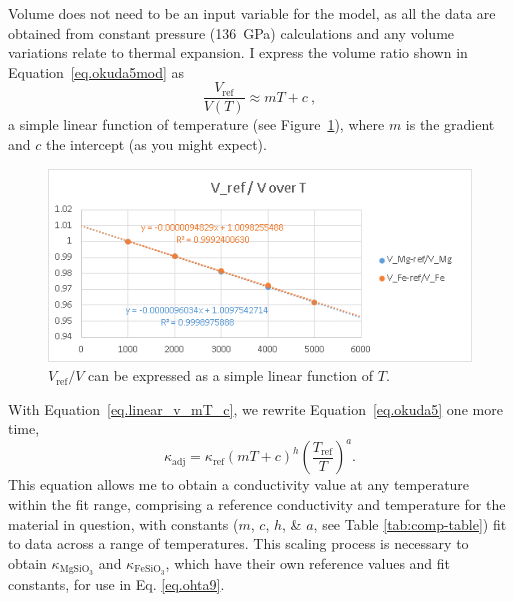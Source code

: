 Volume does not need to be an input variable for the model, as all the data are obtained from constant pressure (136~GPa) calculations and any volume variations relate to thermal expansion. I express the volume ratio shown in Equation~\ref{eq.okuda5mod} as 
%
\begin{equation}
\frac{V_{\mathrm{ref}}}{V(T)} \approx  mT+c \ ,
\label{eq.linear_v_mT_c}
\end{equation}
%
a simple linear function of temperature (see Figure~\ref{fig:draft_VrefV-T}), where $m$ is the gradient and $c$ the intercept (as you might expect). 

\begin{figure}[h!]
  \includegraphics[width=\linewidth]{Figures/draft_VrefV-T.png}
  \caption[CONTENTS BIT]{$V_{\mathrm{ref}}/V$ can be expressed as a simple linear function of $T$.}
  \label{fig:draft_VrefV-T}
\end{figure}

With Equation~\ref{eq.linear_v_mT_c}, we rewrite Equation~\ref{eq.okuda5} one more time,
%
\begin{equation}
\kappa_{\mathrm{adj}}=\kappa_{\mathrm{ref}} \left ( mT+c \right )^{h} \left ( \frac{T_{\mathrm{ref}}}{T} \right )^{a}.
\label{eq.okuda5modmod}
\end{equation}
%
This equation allows me to obtain a conductivity value at any temperature within the fit range, comprising a reference conductivity and temperature for the material in question, with constants ($m$, $c$, $h$, \& $a$, see Table \ref{tab:comp-table}) fit to data across a range of temperatures. This scaling process is necessary to obtain $\kappa_{\mathrm{MgSiO_{3}}}$ and $\kappa_{\mathrm{FeSiO_{3}}}$, which have their own reference values and fit constants, for use in Eq. \ref{eq.ohta9}.


